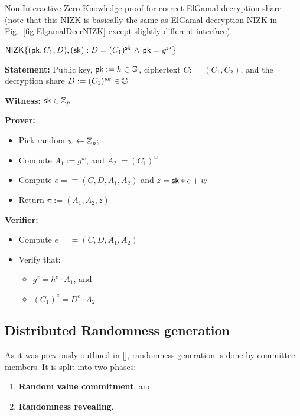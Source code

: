 \FloatBarrier
\begin{boxfig}{\label{fig:DecrShareNIZK}Non-Interactive Zero Knowledge proof for correct ElGamal decryption share (note that this NIZK is basically the same as ElGamal decryption NIZK in Fig.~\ref{fig:ElgamalDecrNIZK} except slightly different interface)}{}
\begin{center}
$\mathsf{NIZK}\{(\mathsf{pk}, C_1, D ),(\mathsf{sk}): D = (C_1)^{\mathsf{sk}} \, \wedge \, \mathsf{pk} = g^{\mathsf{sk}}\}$
\end{center}

\textbf{Statement:} Public key, $\mathsf{pk}:=h \in\mathbb{G}$,  ciphertext $C: =(C_1, C_2 )$, and the decryption share $D:=(C_1)^{sk} \in\mathbb{G}$

\textbf{Witness:} $\mathsf{sk}\in\mathbb{Z}_p$

\medskip
\textbf{Prover:}
\begin{itemize}
\item Pick random $w \leftarrow  {\mathbb{Z}_p}$; 
\item Compute $A_1 := g^w$, and $A_2 := (C_1)^w $
\item Compute $e = \hash(C,D,A_1,A_2)$ and  $ z = \mathsf{sk}*e + w$
\item Return $\pi:=(A_1,A_2,z)$
\end{itemize}

\textbf{Verifier:}
\begin{itemize}
\item Compute $e = \hash(C,D,A_1,A_2)$
\item Verify that:
    \begin{itemize}
    \item $g^z = h^e \cdot A_1$, and
    \item $(C_1)^{z} = D^e \cdot A_2$ 
    \end{itemize}
\end{itemize}
\end{boxfig}

\subsection{Distributed Randomness generation}

As it was previously outlined in [], randomness generation is done by committee members. It is split into two phases:
\begin{enumerate}
	\item \textbf{Random value commitment}, and
	\item \textbf{Randomness revealing}.
\end{enumerate}

